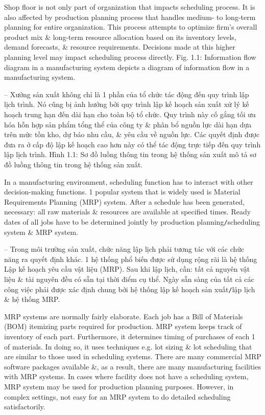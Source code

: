 \documentclass{article}
\begin{document}
\begin{itemize}
\begin{itemize}
\begin{itemize}
            Shop floor is not only part of organization that impacts scheduling process. It is also affected by production planning process that handles medium- to long-term planning for entire organization. This process attempts to optimize firm's overall product mix \& long-term resource allocation based on its inventory levels, demand forecasts, \& resource requirements. Decisions made at this higher planning level may impact scheduling process directly. {\sf Fig. 1.1: Information flow diagram in a manufacturing system} depicts a diagram of information flow in a manufacturing system.

            -- Xưởng sản xuất không chỉ là 1 phần của tổ chức tác động đến quy trình lập lịch trình. Nó cũng bị ảnh hưởng bởi quy trình lập kế hoạch sản xuất xử lý kế hoạch trung hạn đến dài hạn cho toàn bộ tổ chức. Quy trình này cố gắng tối ưu hóa hỗn hợp sản phẩm tổng thể của công ty \& phân bổ nguồn lực dài hạn dựa trên mức tồn kho, dự báo nhu cầu, \& yêu cầu về nguồn lực. Các quyết định được đưa ra ở cấp độ lập kế hoạch cao hơn này có thể tác động trực tiếp đến quy trình lập lịch trình. {\sf Hình 1.1: Sơ đồ luồng thông tin trong hệ thống sản xuất} mô tả sơ đồ luồng thông tin trong hệ thống sản xuất.

            In a manufacturing environment, scheduling function has to interact with other decision-making functions. 1 popular system that is widely used is Material Requirements Planning (MRP) system. After a schedule has been generated, necessary: all raw materials \& resources are available at specified times. Ready dates of all jobs have to be determined jointly by production planning{\tt/}scheduling system \& MRP system.

            -- Trong môi trường sản xuất, chức năng lập lịch phải tương tác với các chức năng ra quyết định khác. 1 hệ thống phổ biến được sử dụng rộng rãi là hệ thống Lập kế hoạch yêu cầu vật liệu (MRP). Sau khi lập lịch, cần: tất cả nguyên vật liệu \& tài nguyên đều có sẵn tại thời điểm cụ thể. Ngày sẵn sàng của tất cả các công việc phải được xác định chung bởi hệ thống lập kế hoạch sản xuất{\tt/}lập lịch \& hệ thống MRP.

            MRP systems are normally fairly elaborate. Each job has a Bill of Materials (BOM) itemizing parts required for production. MRP system keeps track of inventory of each part. Furthermore, it determines timing of purchases of each 1 of materials. In doing so, it uses techniques e.g. lot sizing \& lot scheduling that are similar to those used in scheduling systems. There are many commercial MRP software packages available \&, as a result, there are many manufacturing facilities with MRP systems. In cases where facility does not have a scheduling system, MRP system may be used for production planning purposes. However, in complex settings, not easy for an MRP system to do detailed scheduling satisfactorily.


\end{itemize}
\end{itemize}
\end{itemize}
\end{document}
